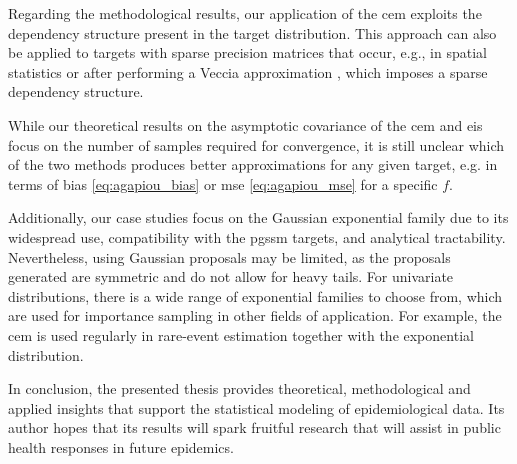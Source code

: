 Regarding the methodological results, our application of the \gls{cem} exploits the dependency structure present in the target distribution. This approach can also be applied to targets with sparse precision matrices that occur, e.g., in spatial statistics or after performing a Veccia approximation \citep{Katzfuss2021General}, which imposes a sparse dependency structure. 

While our theoretical results on the asymptotic covariance of the \gls{cem} and \gls{eis} focus on the number of samples required for convergence, it is still unclear which of the two methods produces better approximations for any given target, e.g. in terms of bias \eqref{eq:agapiou_bias} or \gls{mse} \eqref{eq:agapiou_mse} for a specific $f$. 

Additionally, our case studies focus on the Gaussian exponential family due to its widespread use, compatibility with the \gls{pgssm} targets, and analytical tractability. Nevertheless, using Gaussian proposals may be limited, as the proposals generated are symmetric and do not allow for heavy tails. For univariate distributions, there is a wide range of exponential families to choose from, which are used for importance sampling in other fields of application. For example, the \gls{cem} is used regularly in rare-event estimation together with the exponential distribution.




In conclusion, the presented thesis provides theoretical, methodological and applied insights that support the statistical modeling of epidemiological data. Its author hopes that its results will spark fruitful research that will assist in public health responses in future epidemics.